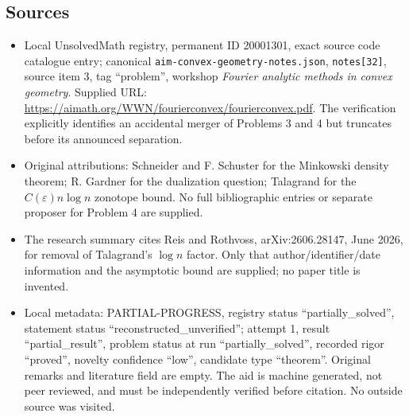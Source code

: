 \documentclass[11pt]{article}
\begin{document}
\subsection{Sources}
\begin{itemize}
\item Local UnsolvedMath registry, permanent ID 20001301, exact source code catalogue entry; canonical \texttt{aim-convex-geometry-notes.json}, \texttt{notes[32]}, source item 3, tag ``problem'', workshop \emph{Fourier analytic methods in convex geometry}. Supplied URL: \url{https://aimath.org/WWN/fourierconvex/fourierconvex.pdf}. The verification explicitly identifies an accidental merger of Problems 3 and 4 but truncates before its announced separation.
\item Original attributions: Schneider and F. Schuster for the Minkowski density theorem; R. Gardner for the dualization question; Talagrand for the $C(\varepsilon)n\log n$ zonotope bound. No full bibliographic entries or separate proposer for Problem 4 are supplied.
\item The research summary cites Reis and Rothvoss, arXiv:2606.28147, June 2026, for removal of Talagrand's $\log n$ factor. Only that author/identifier/date information and the asymptotic bound are supplied; no paper title is invented.
\item Local metadata: PARTIAL-PROGRESS, registry status ``partially\_solved'', statement status ``reconstructed\_unverified''; attempt 1, result ``partial\_result'', problem status at run ``partially\_solved'', recorded rigor ``proved'', novelty confidence ``low'', candidate type ``theorem''. Original remarks and literature field are empty. The aid is machine generated, not peer reviewed, and must be independently verified before citation. No outside source was visited.
\end{itemize}
\end{document}
